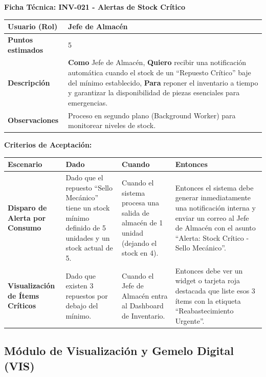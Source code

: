 \noindent
\textbf{Ficha Técnica: INV-021 - Alertas de Stock Crítico}
\footnotesize
\begin{longtable}{|p{}|p{}|}
\hline
\textbf{Usuario (Rol)} & Jefe de Almacén \\ \hline
\textbf{Puntos estimados} & 5 \\ \hline
\textbf{Descripción} & \textbf{Como} Jefe de Almacén, \textbf{Quiero} recibir una notificación automática cuando el stock de un ``Repuesto Crítico'' baje del mínimo establecido, \textbf{Para} reponer el inventario a tiempo y garantizar la disponibilidad de piezas esenciales para emergencias. \\ \hline
\textbf{Observaciones} & Proceso en segundo plano (Background Worker) para monitorear niveles de stock. \\ \hline
\end{longtable}
\normalsize

\noindent
\textbf{Criterios de Aceptación:}
\footnotesize
\begin{longtable}{|p{}|p{}|p{}|p{}|}
\hline
\textbf{Escenario} & \textbf{Dado} & \textbf{Cuando} & \textbf{Entonces} \\ \hline
\endhead
\textbf{Disparo de Alerta por Consumo} & Dado que el repuesto ``Sello Mecánico'' tiene un stock mínimo definido de 5 unidades y un stock actual de 5. & Cuando el sistema procesa una salida de almacén de 1 unidad (dejando el stock en 4). & Entonces el sistema debe generar inmediatamente una notificación interna y enviar un correo al Jefe de Almacén con el asunto ``Alerta: Stock Crítico - Sello Mecánico''. \\ \hline
\textbf{Visualización de Ítems Críticos} & Dado que existen 3 repuestos por debajo del mínimo. & Cuando el Jefe de Almacén entra al Dashboard de Inventario. & Entonces debe ver un widget o tarjeta roja destacada que liste esos 3 ítems con la etiqueta ``Reabastecimiento Urgente''. \\ \hline
\end{longtable}
\normalsize

\subsection{Módulo de Visualización y Gemelo Digital (VIS)}


